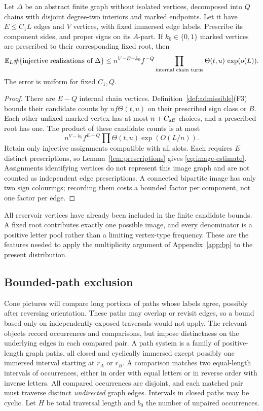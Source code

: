 \begin{lemma}\label{lem:image}
Let $\Delta$ be an abstract finite graph without isolated vertices, decomposed into $Q$ chains with disjoint degree-two interiors and marked endpoints. Let it have $E\le C_1L$ edges and $V$ vertices, with fixed immersed edge labels. Prescribe its component sides, and proper signs on its $A$-part. If $k_0\in\{0,1\}$ marked vertices are prescribed to their corresponding fixed root, then
\begin{equation}\label{eq:image-estimate}
 \mathbb E_L\#\{\text{injective realizations of }\Delta\}
 \le n^{V-E-k_0}f^{-Q}
 \prod_{\text{internal chain turns}}\Theta(t,u)\,\exp(o(L)).
\end{equation}
The error is uniform for fixed $C_1,Q$.
\end{lemma}
\begin{proof}
There are $E-Q$ internal chain vertices. Definition~\ref{def:admissible}(F3) bounds their candidate counts by $nf\Theta(t,u)$ on their prescribed sign class or $B$. Each other unfixed marked vertex has at most $n+C_{\rm aff}$ choices, and a prescribed root has one. The product of these candidate counts is at most
\[
 n^{V-k_0}f^{E-Q}\prod\Theta(t,u)\exp(O(L/n)).
\]
Retain only injective assignments compatible with all slots. Each requires $E$ distinct prescriptions, so Lemma~\ref{lem:prescriptions} gives \eqref{eq:image-estimate}. Assignments identifying vertices do not represent this image graph and are not counted as independent edge prescriptions. A connected bipartite image has only two sign colourings; recording them costs a bounded factor per component, not one factor per edge.
\end{proof}

All reservoir vertices have already been included in the finite candidate bounds. A fixed root contributes exactly one possible image, and every denominator is a positive letter pool rather than a limiting vertex-type frequency. These are the features needed to apply the multiplicity argument of Appendix~\ref{app:bp} to the present distribution.

\subsection{Bounded-path exclusion}

Cone pictures will compare long portions of paths whose labels agree, possibly after reversing orientation. These paths may overlap or revisit edges, so a bound based only on independently exposed traversals would not apply. The relevant objects record occurrences and comparisons, but impose distinctness on the underlying edges in each compared pair.
A path system is a family of positive-length graph paths, all closed and cyclically immersed except possibly one immersed interval starting at $r_A$ or $r_B$. A comparison matches two equal-length intervals of occurrences, either in order with equal letters or in reverse order with inverse letters. All compared occurrences are disjoint, and each matched pair must traverse distinct \emph{undirected} graph edges. Intervals in closed paths may be cyclic. Let $H$ be total traversal length and $b_0$ the number of unpaired occurrences.

